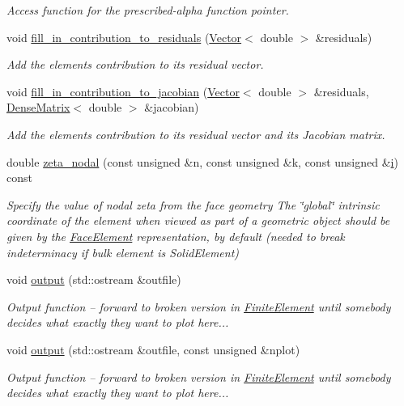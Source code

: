 \begin{DoxyCompactItemize}
\begin{DoxyCompactList}\small\item\em Access function for the prescribed-\/alpha function pointer. \end{DoxyCompactList}\item 
void \hyperlink{classoomph_1_1AxisymAdvectionDiffusionFluxElement_a2264f12223ccbcc2f4e3f89403fddea4}{fill\+\_\+in\+\_\+contribution\+\_\+to\+\_\+residuals} (\hyperlink{classoomph_1_1Vector}{Vector}$<$ double $>$ \&residuals)
\begin{DoxyCompactList}\small\item\em Add the element\textquotesingle{}s contribution to its residual vector. \end{DoxyCompactList}\item 
void \hyperlink{classoomph_1_1AxisymAdvectionDiffusionFluxElement_a6dc7a3bc74b66449b6588d8ea64e7cd7}{fill\+\_\+in\+\_\+contribution\+\_\+to\+\_\+jacobian} (\hyperlink{classoomph_1_1Vector}{Vector}$<$ double $>$ \&residuals, \hyperlink{classoomph_1_1DenseMatrix}{Dense\+Matrix}$<$ double $>$ \&jacobian)
\begin{DoxyCompactList}\small\item\em Add the element\textquotesingle{}s contribution to its residual vector and its Jacobian matrix. \end{DoxyCompactList}\item 
double \hyperlink{classoomph_1_1AxisymAdvectionDiffusionFluxElement_a889e0d213add699c8237bf4fbe10abfe}{zeta\+\_\+nodal} (const unsigned \&n, const unsigned \&k, const unsigned \&\hyperlink{cfortran_8h_adb50e893b86b3e55e751a42eab3cba82}{i}) const
\begin{DoxyCompactList}\small\item\em Specify the value of nodal zeta from the face geometry The \char`\"{}global\char`\"{} intrinsic coordinate of the element when viewed as part of a geometric object should be given by the \hyperlink{classoomph_1_1FaceElement}{Face\+Element} representation, by default (needed to break indeterminacy if bulk element is Solid\+Element) \end{DoxyCompactList}\item 
void \hyperlink{classoomph_1_1AxisymAdvectionDiffusionFluxElement_a5f97a254586d93abb151a25a4a148622}{output} (std\+::ostream \&outfile)
\begin{DoxyCompactList}\small\item\em Output function -- forward to broken version in \hyperlink{classoomph_1_1FiniteElement}{Finite\+Element} until somebody decides what exactly they want to plot here... \end{DoxyCompactList}\item 
void \hyperlink{classoomph_1_1AxisymAdvectionDiffusionFluxElement_ab2ba0c3df1b8ba82db067be66e83ce5b}{output} (std\+::ostream \&outfile, const unsigned \&nplot)
\begin{DoxyCompactList}\small\item\em Output function -- forward to broken version in \hyperlink{classoomph_1_1FiniteElement}{Finite\+Element} until somebody decides what exactly they want to plot here... \end{DoxyCompactList}\end{DoxyCompactItemize}
